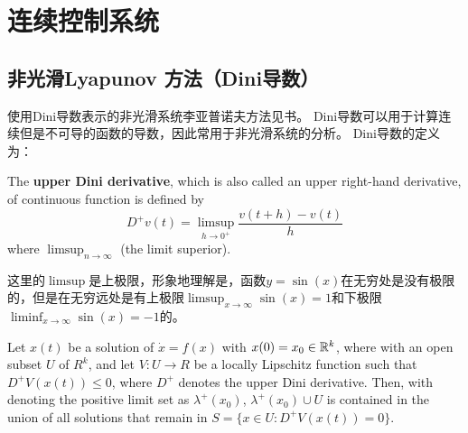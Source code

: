 \chapter{连续控制系统}


\section{非光滑Lyapunov 方法（Dini导数）}

使用Dini导数表示的非光滑系统李亚普诺夫方法见书\cite{roucheStabilityTheoryLiapunov1977}。
Dini导数可以用于计算连续但是不可导的函数的导数，因此常用于非光滑系统的分析。
Dini导数的定义为：

\begin{definition}[Dini导数]
  The \textbf{upper Dini derivative}, which is also called an upper right-hand derivative, of continuous function  is defined by 
  \begin{equation}
    D^+ v(t) = \limsup_{h\to 0^+} \frac{v(t+h)-v(t)}{h}
  \end{equation}
  where $\limsup_{n\to\infty}$ (the limit superior).
\end{definition}
这里的$\limsup$是上极限，形象地理解是，函数$y=\sin(x)$在无穷处是没有极限的，但是在无穷远处是有上极限$\limsup_{x\to\infty} \sin(x)=1$和下极限$\liminf_{x\to\infty} \sin(x)=-1$的。

\begin{lemma}
  Let $x(t)$ be a solution of $\dot{x} = f(x)$ with $x(0) = x_0 \in \mathbb{R}^k$, where  with an open subset $U$ of $R^k$, and let $V: U \to R$ be a locally Lipschitz function such that $D^+V(x(t)) ≤ 0$, where $D^+$ denotes the upper Dini derivative. 
  Then, with denoting the positive limit set as $\lambda^+(x_0)$, $\lambda^+(x_0)\cup U$ is contained in the union of all solutions that remain in $S = \{x \in U : D^+V(x(t)) = 0\}$.
\end{lemma}